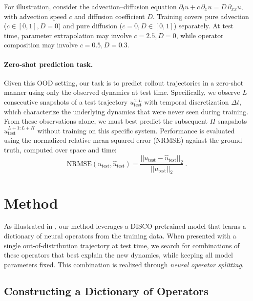 \documentclass{article}
\theoremstyle{plain}
\theoremstyle{definition}
\theoremstyle{remark}
\begin{document}
For illustration, consider the advection–diffusion equation $\partial_t u + c \, \partial_x u = D \, \partial_{xx} u$, with advection speed $c$ and diffusion coefficient $D$. Training covers pure advection ($c \in [0,1], D=0$) and pure diffusion ($c=0, D \in [0,1]$) separately. At test time, parameter extrapolation may involve $c=2.5, D=0$, while operator composition may involve $c=0.5, D=0.3$.


\paragraph{Zero-shot prediction task.}
Given this OOD setting, our task is to predict rollout trajectories in a zero-shot manner using only the observed dynamics at test time. Specifically, we observe $L$ consecutive snapshots of a test trajectory $u_{\text{test}}^{1:L}$ with temporal discretization $\Delta t$, which characterize the underlying dynamics that were never seen during training. 
From these observations alone, we must best predict the subsequent $H$ snapshots $\hat{u}_{\text{test}}^{L+1:L+H}$ without training on this specific system. Performance is evaluated using the normalized relative mean squared error (NRMSE) against the ground truth, computed over space and time: 
$$ 
\text{NRMSE}(u_{\text{test}}, \hat{u}_{\text{test}}) = \frac{||u_{\text{test}} - \hat{u}_{\text{test}}||_2}{||u_{\text{test}}||_2} ~ . 
$$

\section{Method}

As illustrated in , our method leverages a DISCO-pretrained model that learns a dictionary of neural operators from the training data. When presented with a single out-of-distribution trajectory at test time, we search for combinations of these operators that best explain the new dynamics, while keeping all model parameters fixed. This combination is realized through \emph{neural operator splitting}.


\subsection{Constructing a Dictionary of Operators}
\end{document}
